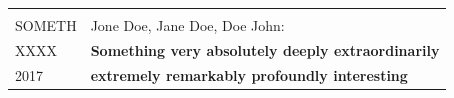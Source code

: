 \documentclass{article}
\begin{document}
\begin{adjustwidth}{-1.5cm}{-1.5cm}
\begin{vwcol}[widths={0.3,0.6},
 sep=3.5cm, justify=top,rule=0pt,indent=0em]
\begin{minipage}[t]{0.7\textwidth}
\begin{tabular}{L{1.05\textwidth}}
      \\
    \end{tabular}
     \begin{tabular}{C{.17\textwidth}|L{.85\textwidth}}
 \\
SOMETH&Jone Doe, Jane Doe, Doe John:\\   
XXXX&  \textbf{Something very absolutely deeply extraordinarily } \\
2017&  \textbf{extremely remarkably profoundly interesting} \\
 \end{tabular}
\end{minipage}
\end{vwcol}
 

\end{adjustwidth}
\end{document}
